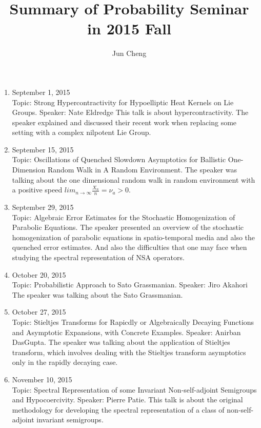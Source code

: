 \documentclass{article}
\begin{document}
 

\title{Summary of Probability Seminar in 2015 Fall} 
\author{Jun Cheng} 
\maketitle


\begin{enumerate} 


\item September 1, 2015 \\
Topic:  Strong Hypercontractivity for Hypoelliptic Heat Kernels on Lie Groups. Speaker: Nate Eldredge 
This talk is about hypercontractivity. The speaker explained and discussed their recent work when replacing some setting with a complex nilpotent Lie Group. 

\item  September 15, 2015 \\
Topic: Oscillations of Quenched Slowdown Asymptotics for Ballistic One-Dimension Random Walk in A Random Environment. 
The speaker was talking about the one dimensional random walk in random environment with a positive speed $lim_{n\rightarrow\infty}\frac{X_n}{n}=\nu_a>0$. 

\item September 29, 2015 \\
Topic: Algebraic Error Estimates for the Stochastic Homogenization of Parabolic Equations. 
The speaker presented an overview of the stochastic homogenization of parabolic equations in spatio-temporal media and also the quenched error estimates. And also the difficulties that one may face when studying the spectral representation of NSA operators. 


\item October 20, 2015  \\
Topic:  Probabilistic Approach to Sato Grassmanian. Speaker: Jiro Akahori 
The speaker was talking about the Sato Grassmanian. 

\item October 27, 2015  \\
Topic: Stieltjes Transforms for Rapicdly or Algebraically Decaying Functions and Asymptotic Expansions, with Concrete Examples. Speaker: Anirban DasGupta. 
The speaker was talking about the application of Stieltjes transform, which involves dealing with the Stieltjes transform asymptotics only in the rapidly decaying case. 



\item November 10, 2015  \\
Topic: Spectral Representation of some Invariant Non-self-adjoint Semigroups and Hypocoercivity. Speaker: Pierre Patie. 
This talk is about the original methodology for developing the spectral representation of a class of non-self-adjoint invariant semigroups. 


\end{enumerate}
\end{document}
